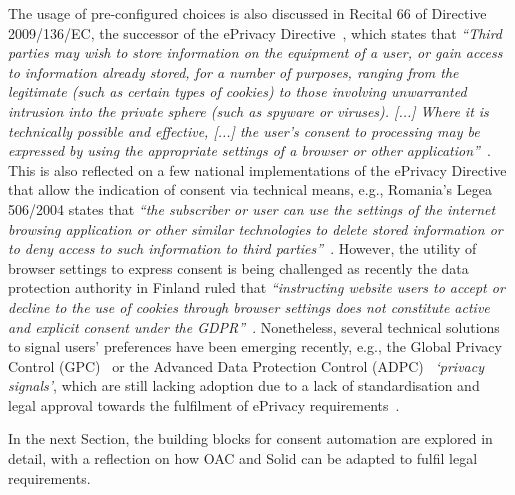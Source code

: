 The usage of pre-configured choices is also discussed in Recital 66 of Directive 2009/136/EC, the successor of the ePrivacy Directive~\citeyearpar{noauthor_directive_2002}, which states that \textit{``Third parties may wish to store information on the equipment of a user, or gain access to information already stored, for a number of purposes, ranging from the legitimate (such as certain types of cookies) to those involving unwarranted intrusion into the private sphere (such as spyware or viruses). [...] Where it is technically possible and effective, [...] the user's consent to processing may be expressed by using the appropriate settings of a browser or other application''}~\citeyearpar{noauthor_directive_2009}.
This is also reflected on a few national implementations of the ePrivacy Directive that allow the indication of consent via technical means, e.g., Romania's Legea 506/2004 states that \textit{``the subscriber or user can use the settings of the internet browsing application or other similar technologies to delete stored information or to deny access to such information to third parties''}~\citeyearpar{noauthor_legea_2004}.
However, the utility of browser settings to express consent is being challenged as recently the data protection authority in Finland ruled that \textit{``instructing website users to accept or decline to the use of cookies through browser settings does not constitute active and explicit consent under the GDPR''}~\citep{fich_finland_2021}.
Nonetheless, several technical solutions to signal users' preferences have been emerging recently, e.g., the Global Privacy Control (GPC)~\citeyearpar{global_privacy_control_gpc_2021} or the Advanced Data Protection Control (ADPC)~\citep{human_advanced_2021} \textit{`privacy signals'}, which are still lacking adoption due to a lack of standardisation and legal approval towards the fulfilment of ePrivacy requirements~\citep{santos_how_2023}.

In the next Section, the building blocks for consent automation are explored in detail, with a reflection on how OAC and Solid can be adapted to fulfil legal requirements. 